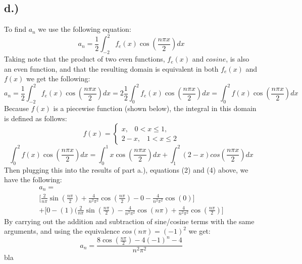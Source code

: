 \documentclass{article}
\begin{document}
\subsection*{d.)}
To find $a_n$ we use the following equation:
\begin{equation}
a_n = \frac{1}{2} \int_{-2}^2 f_e(x)\cos(\frac{n\pi x}{2})dx
\end{equation}
Taking note that the product of two even functions, $f_e(x)$ and $cosine$, is also an even function, and that the resulting domain is equivalent in both $f_e(x)$ and $f(x)$ we get the following:
\begin{equation}
a_n = \frac{1}{2} \int_{-2}^2 f_e(x)\cos(\frac{n\pi x}{2})dx = 2\frac{1}{2} \int_0^2 f_e(x)\cos(\frac{n\pi x}{2})dx = \int_0^2 f(x)\cos(\frac{n\pi x}{2})dx
\end{equation}
Because $f(x)$ is a piecewise function (shown below), the integral in this domain is defined as follows:
\[f(x)=
  \begin{cases}
			x, \; \; \; 0<x\leq 1, \\
			2-x, \; \; \; 1 < x \leq 2
            \end{cases}
\]
\begin{equation}
 \int_0^2 f(x)\cos(\frac{n\pi x}{2})dx = \int_0^1 x\cos(\frac{n\pi x}{2})dx + \int_1^2 (2-x)cos(\frac{n\pi x}{2})dx
\end{equation}
Then plugging this into the results of part a.), equations (2) and (4) above, we have the following:
\begin{multline}
a_n = \\ \Big[ \frac{2}{n\pi}\sin(\frac{n\pi}{2}) + \frac{4}{n^2\pi^2}\cos(\frac{n\pi}{2}) - 0 - \frac{4}{n^2\pi^2}\cos(0) \Big] \\ + \Big[ 0 - (1)(\frac{2}{n\pi}\sin(\frac{n\pi}{2}) - \frac{4}{n^2\pi^2}\cos(n\pi) + \frac{4}{n^2\pi^2}\cos(\frac{n\pi}{2}) \Big]
\end{multline}
By carrying out the addition and subtraction of sine/cosine terms with the same arguments, and using the equivalence $cos(n\pi) = (-1)^2$ we get:
\begin{equation}
a_n = \frac{8\cos(\frac{n\pi}{2}) - 4(-1)^n - 4}{n^2\pi^2}
\end{equation}
bla
\end{document}
